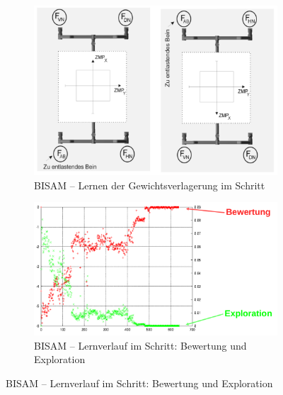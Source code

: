 \begin{figure}
	\centering
	\begin{subfigure}{.4\textwidth}
		\includegraphics[width=\textwidth]{figures/bisam_gewichtsverlagerung_schritt.png}
		\caption{BISAM -- Lernen der Gewichtsverlagerung im Schritt}
	\end{subfigure}
	\begin{subfigure}{.4\textwidth}
		\includegraphics[width=\textwidth]{figures/bisam_gewichtsverlagerung_schritt_1.png}
		\caption{BISAM -- Lernverlauf im Schritt: Bewertung und Exploration}
	\end{subfigure}
\end{figure}

